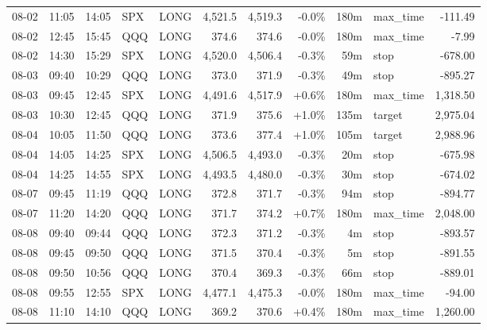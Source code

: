 \documentclass[11pt,a4paper,twoside]{article}
\begin{document}
\begin{center}
\begin{longtable}{>{\color{txtmain}}l l l l l r r r r >{\color{txtmain}}l r}
08-02 & 11:05 & 14:05 & SPX & LONG & 4,521.5 & 4,519.3 & \textcolor{lossred}{-0.0\%} & 180m & max\_time & \textcolor{lossred}{-111.49} \\
08-02 & 12:45 & 15:45 & QQQ & LONG & 374.6 & 374.6 & \textcolor{lossred}{-0.0\%} & 180m & max\_time & \textcolor{lossred}{-7.99} \\
08-02 & 14:30 & 15:29 & SPX & LONG & 4,520.0 & 4,506.4 & \textcolor{lossred}{-0.3\%} & 59m & stop & \textcolor{lossred}{-678.00} \\
08-03 & 09:40 & 10:29 & QQQ & LONG & 373.0 & 371.9 & \textcolor{lossred}{-0.3\%} & 49m & stop & \textcolor{lossred}{-895.27} \\
08-03 & 09:45 & 12:45 & SPX & LONG & 4,491.6 & 4,517.9 & \textcolor{wingreen}{+0.6\%} & 180m & max\_time & \textcolor{wingreen}{1,318.50} \\
08-03 & 10:30 & 12:45 & QQQ & LONG & 371.9 & 375.6 & \textcolor{wingreen}{+1.0\%} & 135m & target & \textcolor{wingreen}{2,975.04} \\
08-04 & 10:05 & 11:50 & QQQ & LONG & 373.6 & 377.4 & \textcolor{wingreen}{+1.0\%} & 105m & target & \textcolor{wingreen}{2,988.96} \\
08-04 & 14:05 & 14:25 & SPX & LONG & 4,506.5 & 4,493.0 & \textcolor{lossred}{-0.3\%} & 20m & stop & \textcolor{lossred}{-675.98} \\
08-04 & 14:25 & 14:55 & SPX & LONG & 4,493.5 & 4,480.0 & \textcolor{lossred}{-0.3\%} & 30m & stop & \textcolor{lossred}{-674.02} \\
08-07 & 09:45 & 11:19 & QQQ & LONG & 372.8 & 371.7 & \textcolor{lossred}{-0.3\%} & 94m & stop & \textcolor{lossred}{-894.77} \\
08-07 & 11:20 & 14:20 & QQQ & LONG & 371.7 & 374.2 & \textcolor{wingreen}{+0.7\%} & 180m & max\_time & \textcolor{wingreen}{2,048.00} \\
08-08 & 09:40 & 09:44 & QQQ & LONG & 372.3 & 371.2 & \textcolor{lossred}{-0.3\%} & 4m & stop & \textcolor{lossred}{-893.57} \\
08-08 & 09:45 & 09:50 & QQQ & LONG & 371.5 & 370.4 & \textcolor{lossred}{-0.3\%} & 5m & stop & \textcolor{lossred}{-891.55} \\
08-08 & 09:50 & 10:56 & QQQ & LONG & 370.4 & 369.3 & \textcolor{lossred}{-0.3\%} & 66m & stop & \textcolor{lossred}{-889.01} \\
08-08 & 09:55 & 12:55 & SPX & LONG & 4,477.1 & 4,475.3 & \textcolor{lossred}{-0.0\%} & 180m & max\_time & \textcolor{lossred}{-94.00} \\
08-08 & 11:10 & 14:10 & QQQ & LONG & 369.2 & 370.6 & \textcolor{wingreen}{+0.4\%} & 180m & max\_time & \textcolor{wingreen}{1,260.00} \\

\end{longtable}
\end{center}
\end{document}
